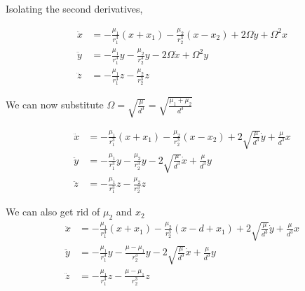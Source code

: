 \documentclass{article}
\begin{document}
Isolating the second derivatives,

\[\begin{aligned}
    \ddot{x}&=-\frac{\mu_1}{r_1^3}(x+x_1)-\frac{\mu_2}{r_2^3}(x-x_2)+2\Omega\dot{y}+\Omega^2 x\\
    \ddot{y}&=-\frac{\mu_1}{r_1^3}y-\frac{\mu_2}{r_2^3}y-2\Omega\dot{x}+\Omega^2 y\\
    \ddot{z}&=-\frac{\mu_1}{r_1^3}z-\frac{\mu_2}{r_2^3}z
\end{aligned}\]
    
We can now substitute $\Omega=\sqrt{\frac{\mu}{d^3}}=\sqrt{\frac{\mu_1+\mu_2}{d^3}}$

\[\begin{aligned}
    \ddot{x}&=-\frac{\mu_1}{r_1^3}(x+x_1)-\frac{\mu_2}{r_2^3}(x-x_2)+2\sqrt{\frac{\mu}{d^3}}\dot{y}+\frac{\mu}{d^3}x\\
    \ddot{y}&=-\frac{\mu_1}{r_1^3}y-\frac{\mu_2}{r_2^3}y-2\sqrt{\frac{\mu}{d^3}}\dot{x}+\frac{\mu}{d^3}y\\
    \ddot{z}&=-\frac{\mu_1}{r_1^3}z-\frac{\mu_2}{r_2^3}z
\end{aligned}\]

We can also get rid of $\mu_2$ and $x_2$
\[\begin{aligned}
    \ddot{x}&=-\frac{\mu_1}{r_1^3}(x+x_1)-\frac{\mu_2}{r_2^3}(x-d+x_1)+2\sqrt{\frac{\mu}{d^3}}\dot{y}+\frac{\mu}{d^3}x\\
    \ddot{y}&=-\frac{\mu_1}{r_1^3}y-\frac{\mu-\mu_1}{r_2^3}y-2\sqrt{\frac{\mu}{d^3}}\dot{x}+\frac{\mu}{d^3}y\\
    \ddot{z}&=-\frac{\mu_1}{r_1^3}z-\frac{\mu-\mu_1}{r_2^3}z
\end{aligned}\]
\end{document}
